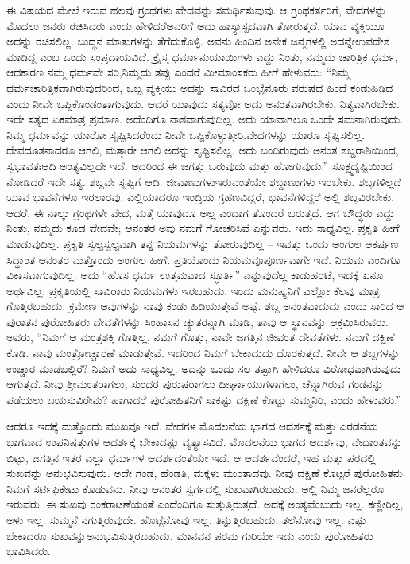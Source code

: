ಈ ವಿಷಯದ ಮೇಲೆ ಇರುವ ಹಲವು ಗ್ರಂಥಗಳು ವೇದವನ್ನು ಸಮರ್ಥಿಸುವುವು. ಆ ಗ್ರಂಥಕರ್ತರಿಗೆ, ವೇದಗಳನ್ನು ಮೊದಲು ಜನರು ರಚಿಸಿದರು ಎಂದು ಹೇಳಿದರೆ\break ಅವರಿಗೆ ಅದು ಹಾಸ್ಯಾಸ್ಪದವಾಗಿ ತೋರುತ್ತದೆ. ಯಾವ ವ್ಯಕ್ತಿಯೂ ಅದನ್ನು ರಚಿಸಲಿಲ್ಲ. ಬುದ್ಧನ ಮಾತುಗಳನ್ನು ತೆಗೆದುಕೊಳ್ಳಿ. ಅವನು ಹಿಂದಿನ ಅನೇಕ ಜನ್ಮಗಳಲ್ಲಿ ಅದನ್ನೇ\break ಉಪದೇಶ ಮಾಡಿದ್ದ ಎಂಬ ಒಂದು ಸಂಪ್ರದಾಯವಿದೆ. ಕ್ರೈಸ್ತ ಧರ್ಮಾನುಯಾಯಿಗಳು ಎದ್ದು ನಿಂತು, ನಮ್ಮದು ಚಾರಿತ್ರಿಕ ಧರ್ಮ, ಆದಕಾರಣ ನಮ್ಮ ಧರ್ಮವೇ ಸರಿ,\break ನಿಮ್ಮದು ತಪ್ಪು ಎಂದರೆ ಮೀಮಾಂಸಕರು ಹೀಗೆ ಹೇಳುವರು: “ನಿಮ್ಮ ಧರ್ಮ\break ಚಾರಿತ್ರಿಕವಾಗಿರುವುದರಿಂದ, ಒಬ್ಬ ವ್ಯಕ್ತಿಯು ಅದನ್ನು ಸಾವಿರದ ಒಂಭೈನೂರು ವರುಷದ ಹಿಂದೆ ಕಂಡುಹಿಡಿದ ಎಂದು ನೀವೇ ಒಪ್ಪಿಕೊಂಡಂತಾಗುವುದು. ಆದರೆ ಯಾವುದು ಸತ್ಯವೋ ಅದು ಅನಂತವಾಗಿರಬೇಕು, ನಿತ್ಯವಾಗಿರಬೇಕು. ಇದೇ ಸತ್ಯದ ಏಕಮಾತ್ರ ಪ್ರಮಾಣ. ಅದೆಂದಿಗೂ ನಾಶವಾಗುವುದಿಲ್ಲ. ಅದು ಯಾವಾಗಲೂ ಒಂದೇ ಸಮನಾಗಿರುವುದು. ನಿಮ್ಮ ಧರ್ಮವನ್ನು ಯಾರೋ ಸೃಷ್ಟಿಸಿದರೆಂದು ನೀವೇ ಒಪ್ಪಿಕೊಳ್ಳುತ್ತೀರಿ.\break ವೇದಗಳನ್ನು ಯಾರೂ ಸೃಷ್ಟಿಸಲಿಲ್ಲ. ದೇವದೂತನಾದರೂ ಆಗಲಿ, ಮತ್ತಾರೇ ಆಗಲಿ ಅದನ್ನು ಸೃಷ್ಟಿಸಲಿಲ್ಲ. ಅದು ಬಂದಿರುವುದು ಅನಂತ ಶಬ್ದರಾಶಿಯಿಂದ, ಸ್ವಭಾವತಃ\break ಆದಿ ಅಂತ್ಯವಿಲ್ಲದೇ ಇದೆ. ಅದರಿಂದ ಈ ಜಗತ್ತು ಬರುವುದು ಮತ್ತು ಹೋಗುವುದು.” ಸೂಕ್ಷ್ಮದೃಷ್ಟಿಯಿಂದ ನೋಡಿದರೆ ಇದೇ ಸತ್ಯ. ಶಬ್ದವೇ ಸೃಷ್ಟಿಗೆ ಆದಿ. ಜೀವಾಣುಗಳು\break ಇರುವಂತೆಯೇ ಶಬ್ದಾಣುಗಳು ಇರಬೇಕು. ಶಬ್ದಗಳಿಲ್ಲದೆ ಯಾವ ಭಾವನೆಗಳೂ ಇರಲಾರವು. ಎಲ್ಲಿಯಾದರೂ ಇಂದ್ರಿಯ ಗ್ರಹಣವಿದ್ದರೆ, ಭಾವನೆಗಳಿದ್ದರೆ ಅಲ್ಲಿ ಶಬ್ದವಿರಬೇಕು. ಆದರೆ, ಈ ನಾಲ್ಕು ಗ್ರಂಥಗಳೇ ವೇದ, ಮತ್ತೆ ಯಾವುದೂ ಅಲ್ಲ ಎಂದಾಗ ತೊಂದರೆ ಬರುತ್ತದೆ. ಆಗ ಬೌದ್ಧರು ಎದ್ದು ನಿಂತು, ನಮ್ಮದು ಕೂಡ ವೇದವೇ; ಆನಂತರ ಅವು ನಮಗೆ ಗೋಚರಿಸಿವೆ ಎನ್ನುವರು. ಇದು ಸಾಧ್ಯವಿಲ್ಲ. ಪ್ರಕೃತಿ ಹೀಗೆ ಮಾಡುವುದಿಲ್ಲ. ಪ್ರಕೃತಿ ಸ್ವಲ್ಪಸ್ವಲ್ಪವಾಗಿ ತನ್ನ ನಿಯಮಗಳನ್ನು ತೋರುವುದಿಲ್ಲ – ಇವತ್ತು ಒಂದು ಅಂಗುಲ ಆಕರ್ಷಣ ಸಿದ್ಧಾಂತ ಆನಂತರ ಮತ್ತೊಂದು ಅಂಗುಲ ಹೀಗೆ. ಪ್ರತಿಯೊಂದು ನಿಯಮವೂ\break ಪೂರ್ಣವಾಗೇ ಇದೆ. ನಿಯಮ ಎಂದಿಗೂ ವಿಕಾಸವಾಗುವುದಿಲ್ಲ. ಅದು “ಹೊಸ ಧರ್ಮ ಉತ್ತಮವಾದ ಸ್ಛೂರ್ತಿ” ಎನ್ನುವುದೆಲ್ಲ ಕಾಡುಹರಟೆ, ಇದಕ್ಕೆ ಏನೂ ಅರ್ಥವಿಲ್ಲ. ಪ್ರಕೃತಿಯಲ್ಲಿ ಸಾವಿರಾರು ನಿಯಮಗಳು ಇರಬಹುದು. ಇಂದು ಮನುಷ್ಯನಿಗೆ ಎಲ್ಲೋ ಕೆಲವು ಮಾತ್ರ ಗೊತ್ತಿರಬಹುದು. ಕ್ರಮೇಣ ಅವುಗಳನ್ನು ನಾವು ಕಂಡು ಹಿಡಿಯುತ್ತೇವೆ ಅಷ್ಟೆ. ಶಬ್ದ ಅನಂತವಾದುದು ಎಂದು ಸಾರಿದ ಆ ಪುರಾತನ ಪುರೋಹಿತರು ದೇವತೆಗಳನ್ನು ಸಿಂಹಾಸನ ಚ್ಯುತರನ್ನಾಗಿ ಮಾಡಿ, ತಾವು ಆ ಸ್ಥಾನವನ್ನು ಆಕ್ರಮಿಸಿರುವರು. ಅವರು, “ನಿಮಗೆ ಆ ಮಂತ್ರಶಕ್ತಿ ಗೊತ್ತಿಲ್ಲ, ನಮಗೆ ಗೊತ್ತು, ನಾವೇ ಜಗತ್ತಿನ ಜೀವಂತ ದೇವತೆಗಳು. ನಮಗೆ ದಕ್ಷಿಣೆ ಕೊಡಿ. ನಾವು ಮಂತ್ರೋಚ್ಚಾರಣೆ ಮಾಡುತ್ತೇವೆ. ಇದರಿಂದ ನಿಮಗೆ ಬೇಕಾದುದು ದೊರಕುತ್ತದೆ. ನೀವೇ ಆ ಶಬ್ದಗಳನ್ನು ಉಚ್ಚಾರ ಮಾಡಬಲ್ಲಿರೆ? ನಿಮಗೆ ಅದು ಸಾಧ್ಯವಿಲ್ಲ. ಅದನ್ನು ಒಂದು ಸಲ ತಪ್ಪಾಗಿ ಹೇಳಿದರೂ ವಿರೋಧವಾಗಿರುವುದು ಆಗುತ್ತದೆ. ನೀವು ಶ‍್ರೀಮಂತರಾಗಲು, ಸುಂದರ ಪುರುಷರಾಗಲು ದೀರ್ಘಾಯುಗಳಾಗಲು, ಚೆನ್ನಾಗಿರುವ ಗಂಡನನ್ನು ಪಡೆಯಲು ಬಯಸುವಿರೇನು? ಹಾಗಾದರೆ ಪುರೋಹಿತನಿಗೆ ಸಾಕಷ್ಟು ದಕ್ಷಿಣೆ ಕೊಟ್ಟು ಸುಮ್ಮನಿರಿ, ಎಂದು ಹೇಳುವರು.”

ಆದರೂ ಇದಕ್ಕೆ ಮತ್ತೊಂದು ಮುಖವೂ ಇದೆ. ವೇದಗಳ ಮೊದಲನೆಯ ಭಾಗದ ಆದರ್ಶಕ್ಕೆ ಮತ್ತು ಎರಡನೆಯ ಭಾಗವಾದ ಉಪನಿಷತ್ತುಗಳ ಆದರ್ಶಕ್ಕೆ ಬೇಕಾದಷ್ಟು ವ್ಯತ್ಯಾಸವಿದೆ. ಮೊದಲನೆಯ ಭಾಗದ ಆದರ್ಶವು, ವೇದಾಂತವನ್ನು ಬಿಟ್ಟು, ಜಗತ್ತಿನ ಇತರ ಎಲ್ಲಾ ಧರ್ಮಗಳ ಆದರ್ಶದಂತೆಯೇ ಇದೆ. ಆ ಆದರ್ಶವೆಂದರೆ, ಇಹ ಮತ್ತು ಪರದಲ್ಲಿ ಸುಖವನ್ನು ಅನುಭವಿಸುವುದು. ಅದೇ ಗಂಡ, ಹೆಂಡತಿ, ಮಕ್ಕಳು ಮುಂತಾದವು. ನೀವು ದಕ್ಷಿಣೆ ಕೊಟ್ಟರೆ ಪುರೋಹಿತನು ನಿಮಗೆ ಸರ್ಟಿಫಿಕೇಟು ಕೊಡುವನು. ನೀವು ಆನಂತರ ಸ್ವರ್ಗದಲ್ಲಿ ಸುಖವಾಗಿರಬಹುದು. ಅಲ್ಲಿ ನಿಮ್ಮ ಜನರೆಲ್ಲರೂ ಇರುವರು. ಈ ಸುಖವು ರಂಕರಾಟಣೆಯಂತೆ  ಎಂದೆಂದಿಗೂ ಸುತ್ತುತ್ತಿರುತ್ತದೆ. ಅದಕ್ಕೆ ಅಂತ್ಯವೆಂಬುದು ಇಲ್ಲ. ಕಣ್ಣೀರಿಲ್ಲ, ಅಳು ಇಲ್ಲ. ಸುಮ್ಮನೆ ನಗುತ್ತಿರುವುದೇ. ಹೊಟ್ಟೆನೋವು ಇಲ್ಲ. ತಿನ್ನುತ್ತಿರಬಹುದು. ತಲೆನೋವು ಇಲ್ಲ. ಎಷ್ಟು ಬೇಕಾದರೂ ಸುಖವನ್ನು\break ಅನುಭವಿಸುತ್ತಿರಬಹುದು. ಮಾನವನ ಪರಮ ಗುರಿಯೇ ಇದು ಎಂದು ಪುರೋಹಿತರು ಭಾವಿಸಿದರು.


